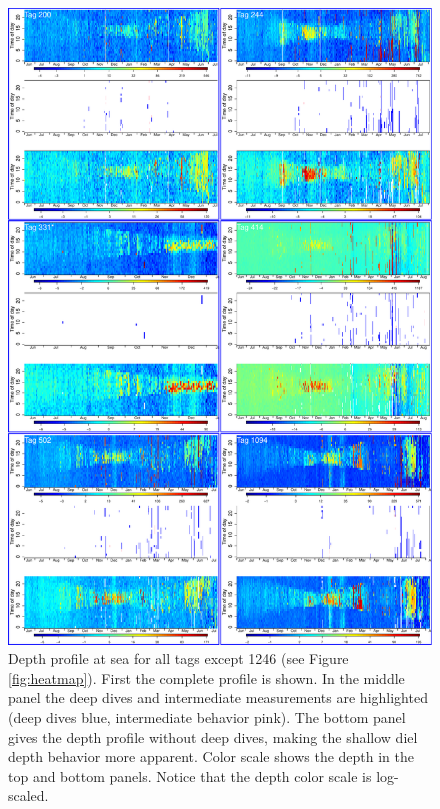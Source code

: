 \begin{figure}[ht]
  \centering
  \includegraphics[width=.85\linewidth]{figS1.pdf}    
  \caption{Depth profile at sea for all tags except 1246 (see Figure \ref{fig:heatmap}). First the complete profile is shown. In the middle panel the deep dives and intermediate measurements are highlighted (deep dives blue, intermediate behavior pink). 
    The bottom panel gives the depth profile without deep dives, making the shallow diel depth behavior more apparent. 
    Color scale shows the depth in the top and bottom panels. Notice that the depth color scale is log-scaled.}
\label{fig:alldep}
\end{figure}





